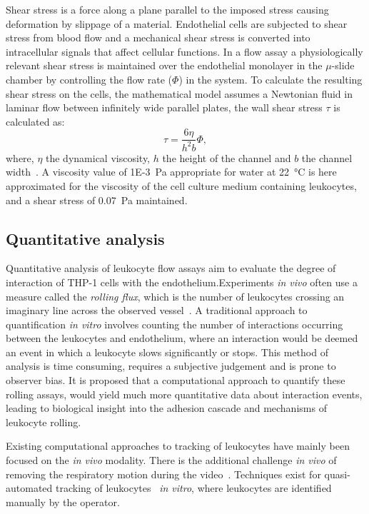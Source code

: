 Shear stress is a force along a plane parallel to the imposed stress causing deformation by slippage of a material. Endothelial cells are subjected to shear stress from blood flow and a mechanical shear stress is converted into intracellular signals that affect cellular functions. In a flow assay a physiologically relevant shear stress is maintained over the endothelial monolayer in the $\mu$-slide chamber by controlling the flow rate ($\Phi$) in the system. To calculate the resulting shear stress on the cells, the mathematical model assumes a Newtonian fluid in laminar flow between infinitely wide parallel plates, the wall shear stress $\tau$ is calculated as:
\begin{equation}
	\tau=\frac{6\eta}{h^2b}\Phi,
\end{equation}
where, $\eta$ the dynamical viscosity, $h$ the height of the channel and $b$ the channel width~\cite{Bacabac2005}. A viscosity value of \SI{1E-3}{Pa} appropriate for water at \SI{22}{\degreeCelsius} is here approximated for the viscosity of the cell culture medium containing leukocytes, and a shear stress of \SI{0.07}{\pascal} maintained.

\subsection{Quantitative analysis}
\label{leukocytes:introduction:quantitative}
Quantitative analysis of leukocyte flow assays aim to evaluate the degree of interaction of THP-1 cells with the endothelium.Experiments \emph{in vivo} often use a measure called the \emph{rolling flux}, which is the number of leukocytes crossing an imaginary line across the observed vessel~\cite{Sperandio2006}. A traditional approach to quantification \emph{in vitro} involves counting the number of interactions occurring between the leukocytes and endothelium, where an interaction would be deemed an event in which a leukocyte slows significantly or stops. This method of analysis is time consuming, requires a subjective judgement and is prone to observer bias. It is proposed that a computational approach to quantify these rolling assays, would yield much more quantitative data about interaction events, leading to biological insight into the adhesion cascade and mechanisms of leukocyte rolling.

Existing computational approaches to tracking of leukocytes have mainly been focused on the \emph{in vivo} modality. There is the additional challenge \emph{in vivo} of removing the respiratory motion during the video~\cite{Ray2002,Sperandio2006}. Techniques exist for quasi-automated tracking of leukocytes~\cite{Acton2002, Debeir2005} \emph{in vitro}, where leukocytes are identified manually by the operator.

